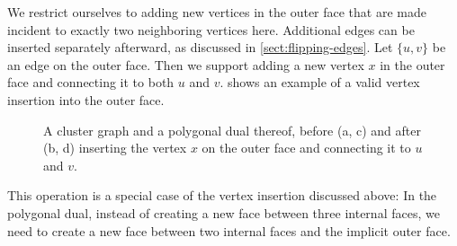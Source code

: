 We restrict ourselves to adding new vertices in the outer face that are made incident to exactly two neighboring vertices here.
Additional edges can be inserted separately afterward, as discussed in \cref{sect:flipping-edges}.
Let $\{u,v\}$ be an edge on the outer face.
Then we support adding a new vertex $x$ in the outer face and connecting it to both $u$ and $v$.
 shows an example of a valid vertex insertion into the outer face.

\begin{figure}[H]
	\centering
	\quad
	\qquad
	\quad
	\caption{A cluster graph and a polygonal dual thereof, before (a, c) and after (b, d) inserting the vertex $x$ on the outer face and connecting it to $u$ and $v$.}
	\label{fig:insert-vertex-example-outside}
\end{figure}

This operation is a special case of the vertex insertion discussed above:
In the polygonal dual, instead of creating a new face between three internal faces, we need to create a new face between two internal faces and the implicit outer face.

